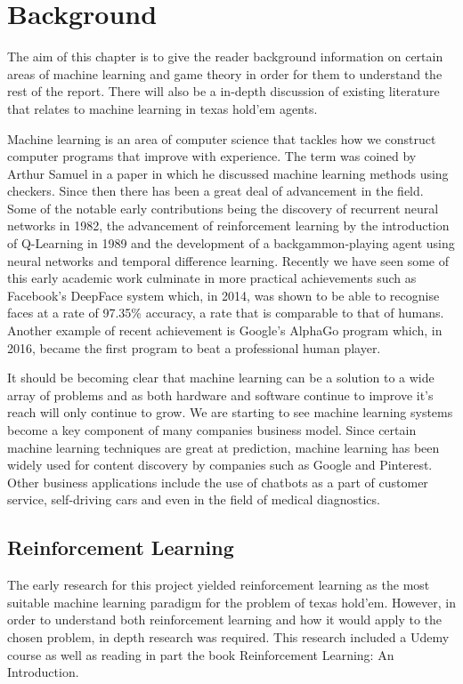 \chapter{Background}
\label{ch:background}

The aim of this chapter is to give the reader background information on certain areas of machine learning and
game theory in order for them to understand the rest of the report.
There will also be a in-depth discussion of existing literature that relates to machine learning in texas hold'em
agents.

Machine learning is an area of computer science that tackles how we construct computer programs that improve
with experience\citep{mitchell1997machine}.
The term was coined by Arthur Samuel in a paper in which he discussed machine learning methods using
checkers\citep{samuel1959some}.
Since then there has been a great deal of advancement in the field.
Some of the notable early contributions being the discovery of recurrent neural networks in 1982,
the advancement of reinforcement learning by the introduction of Q-Learning in 1989 and the
development of a backgammon-playing agent using neural networks and temporal difference learning\citep{tesauro1995td}.
Recently we have seen some of this early academic work culminate in more practical achievements such as
Facebook's DeepFace system which, in 2014,  was shown to be able to recognise faces at a rate of 97.35\% accuracy,
a rate that is comparable to that of humans.
Another example of recent achievement is Google's AlphaGo program which, in 2016, became the first program to beat
a professional human player.

It should be becoming clear that machine learning can be a solution to a wide array of problems and as
both hardware and software continue to improve it's reach will only continue to grow.
We are starting to see machine learning systems become a key component of many companies business model.
Since certain machine learning techniques are great at prediction, machine learning has been widely used
for content discovery by companies such as Google and Pinterest.
Other business applications include the use of chatbots as a part of customer service, self-driving cars
and even in the field of medical diagnostics.


\section{Reinforcement Learning}\label{sec:reinforcementLearning}
The early research for this project yielded reinforcement learning as the most suitable machine learning
paradigm for the problem of texas hold'em.
However, in order to understand both reinforcement learning and how it would apply to the chosen problem,
in depth research was required.
This research included a Udemy course\citep{udemy2018rlpython} as well as reading in part the book
Reinforcement Learning: An Introduction\citep{sutton1998reinforcement}.

